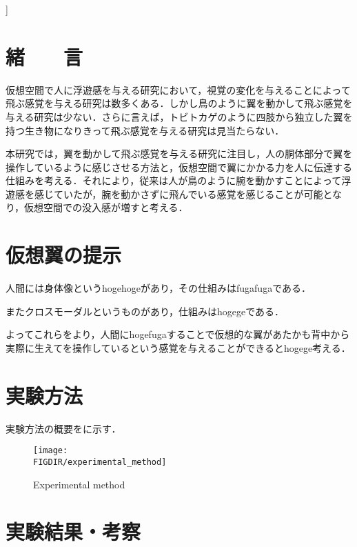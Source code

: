 ]
\begin{small}
\section{緒　　言}
仮想空間で人に浮遊感を与える研究において，視覚の変化を与えることによって飛ぶ感覚を与える研究は数多くある．しかし鳥のように翼を動かして飛ぶ感覚を与える研究は少ない．さらに言えば，トビトカゲのように四肢から独立した翼を持つ生き物になりきって飛ぶ感覚を与える研究は見当たらない．

  本研究では，翼を動かして飛ぶ感覚を与える研究に注目し，人の胴体部分で翼を操作しているように感じさせる方法と，仮想空間で翼にかかる力を人に伝達する仕組みを考える．それにより，従来は人が鳥のように腕を動かすことによって浮遊感を感じていたが，腕を動かさずに飛んでいる感覚を感じることが可能となり，仮想空間での没入感が増すと考える．


\section{仮想翼の提示}
人間には身体像というhogehogeがあり，その仕組みはfugafugaである．

またクロスモーダルというものがあり，仕組みはhogegeである．

よってこれらをより，人間にhogefugaすることで仮想的な翼があたかも背中から実際に生えてを操作しているという感覚を与えることができるとhogege考える．


\section{実験方法}
実験方法の概要をに示す．

\begin{figure}[b]
  \begin{center}
  \texttt{[image: \\FIGDIR/experimental\_method]}%
  \caption{Experimental method}
  \end{center}
  \end{figure}

\section{実験結果・考察}

\end{small}
